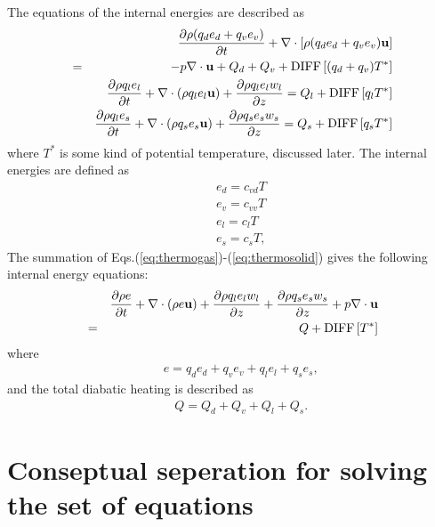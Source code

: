 The equations of the internal energies are described as
\begin{eqnarray}
&&  \frac{\partial \rho (q_d e_d + q_v e_v) }{\partial t} + 
  \nabla \cdot \left[ \rho (q_d e_d + q_v e_v ){\bf u} \right] \nonumber\\
&=& - p \nabla \cdot {\bf u} + Q_{d}+ Q_{v} + {\rm DIFF}\left[(q_d+q_v)T^{*} \right]
\label{eq:thermogas}\\
&&  \frac{\partial \rho q_l e_l}{\partial t} + 
  \nabla \cdot \left( \rho q_l e_l {\bf u} \right) 
+ \frac{\partial \rho q_l e_l w_l}{\partial z}
= Q_l + {\rm DIFF}\left[q_l T^{*} \right]
\label{eq:thermoliquid}\\
&&  \frac{\partial \rho q_l e_s}{\partial t} + 
  \nabla \cdot \left( \rho q_s e_s {\bf u} \right) 
+ \frac{\partial \rho q_s e_s w_s}{\partial z}
= Q_s + {\rm DIFF}\left[q_s T^{*} \right]
\label{eq:thermosolid}
\end{eqnarray}
where $T^*$ is some kind of potential temperature, discussed later.
The internal energies are defined as
\begin{eqnarray}
&& e_d = c_{vd} T\\
&& e_v = c_{vv} T\\
&& e_l = c_{l} T\\
&& e_s = c_{s} T,
\end{eqnarray}
The summation of Eqs.(\ref{eq:thermogas})-(\ref{eq:thermosolid})
gives the following internal energy equations:
\begin{eqnarray}
&&  \frac{\partial \rho e  }{\partial t}
+  \nabla \cdot \left( \rho e {\bf u} \right)
+ \frac{\partial \rho q_l e_l w_l}{\partial z}
 + \frac{\partial \rho q_s e_s w_s}{\partial z}
 + p \nabla \cdot {\bf u}\nonumber\\
&=&  Q + {\rm DIFF}\left[T^{*} \right]
\label{eq:etot}
\end{eqnarray}
where
\begin{eqnarray}
&&  e = q_d e_d + q_v e_v + q_l e_l + q_s e_s,
\end{eqnarray}
and the total diabatic heating is described as
\begin{eqnarray}
&&  Q = Q_d + Q_v + Q_l + Q_s.
\end{eqnarray}

\section{Conseptual seperation for solving the set of equations}

